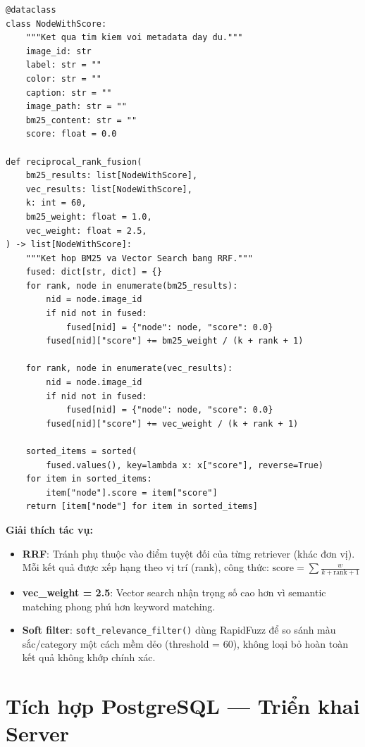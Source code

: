 \documentclass[12pt,a4paper]{report}
\begin{document}
\begin{lstlisting}[caption={Reciprocal Rank Fusion --- search/fusion.py}]
@dataclass
class NodeWithScore:
    """Ket qua tim kiem voi metadata day du."""
    image_id: str
    label: str = ""
    color: str = ""
    caption: str = ""
    image_path: str = ""
    bm25_content: str = ""
    score: float = 0.0

def reciprocal_rank_fusion(
    bm25_results: list[NodeWithScore],
    vec_results: list[NodeWithScore],
    k: int = 60,
    bm25_weight: float = 1.0,
    vec_weight: float = 2.5,
) -> list[NodeWithScore]:
    """Ket hop BM25 va Vector Search bang RRF."""
    fused: dict[str, dict] = {}
    for rank, node in enumerate(bm25_results):
        nid = node.image_id
        if nid not in fused:
            fused[nid] = {"node": node, "score": 0.0}
        fused[nid]["score"] += bm25_weight / (k + rank + 1)

    for rank, node in enumerate(vec_results):
        nid = node.image_id
        if nid not in fused:
            fused[nid] = {"node": node, "score": 0.0}
        fused[nid]["score"] += vec_weight / (k + rank + 1)

    sorted_items = sorted(
        fused.values(), key=lambda x: x["score"], reverse=True)
    for item in sorted_items:
        item["node"].score = item["score"]
    return [item["node"] for item in sorted_items]
\end{lstlisting}

\textbf{Giải thích tác vụ:}
\begin{itemize}
    \item \textbf{RRF}: Tránh phụ thuộc vào điểm tuyệt đối của từng retriever (khác đơn vị). Mỗi kết quả được xếp hạng theo vị trí (rank), công thức: $\text{score} = \sum \frac{w}{k + \text{rank} + 1}$
    \item \textbf{vec\_weight = 2.5}: Vector search nhận trọng số cao hơn vì semantic matching phong phú hơn keyword matching.
    \item \textbf{Soft filter}: \texttt{soft\_relevance\_filter()} dùng RapidFuzz để so sánh màu sắc/category một cách mềm dẻo (threshold = 60), không loại bỏ hoàn toàn kết quả không khớp chính xác.
\end{itemize}

\chapter{Tích hợp PostgreSQL --- Triển khai Server}
\end{document}
